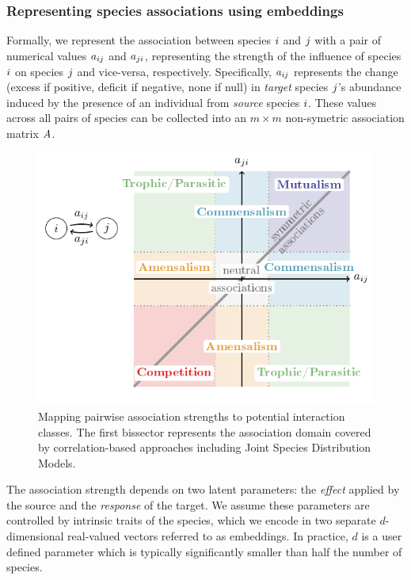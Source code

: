\documentclass[10pt,a4paper]{article}
\begin{document}
\subsubsection{Representing species associations using embeddings}
Formally, we represent the association between species $i$ and
$j$ with a pair of numerical values $a_{ij}$ and
$a_{ji}$, representing the strength of the influence of species
$i$ on species $j$ and vice-versa, respectively. Specifically,
$a_{ij}$ represents the change (excess if
positive, deficit if negative, none if null) in \textit{target}
species $j$'s abundance induced by the presence of an individual
from \textit{source} species $i$.  These values across all pairs of
species can be collected into an $m \times m$ non-symetric association
matrix $A$. \\

\begin{figure}[bthp]
	\centering
	\includegraphics[page=1]{tikz_figures.pdf}
	\caption{Mapping pairwise association strengths to potential interaction classes. The first bissector represents the association domain covered by correlation-based approaches including Joint Species Distribution Models. }
	\label{assocdomain}
\end{figure}

The association strength depends on two latent parameters: the \textit{effect} applied by the source and the \textit{response} of the target. We assume these parameters are controlled by intrinsic traits of the species, which we encode in two separate $d$-dimensional real-valued vectors referred to as embeddings.
In practice, $d$ is a user defined parameter which is typically significantly smaller than half the number of species. \\
\end{document}
